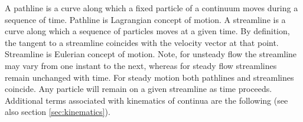 A {pathline} is a curve along which a fixed
particle of a continuum moves during a sequence of time. Pathline
is Lagrangian concept of motion. A
{streamline} is a curve along which a
sequence of particles moves at a given time. By definition, the
tangent to a streamline coincides with the velocity vector at that
point. Streamline is Eulerian concept of motion. Note, for
unsteady flow the streamline may vary from one instant to the
next, whereas for steady flow streamlines remain unchanged with
time. For steady motion both pathlines and streamlines coincide.
Any particle will remain on a given streamline as time proceeds.
Additional terms associated with kinematics of continua are the
following (see also section \ref{sec:kinematics}).
